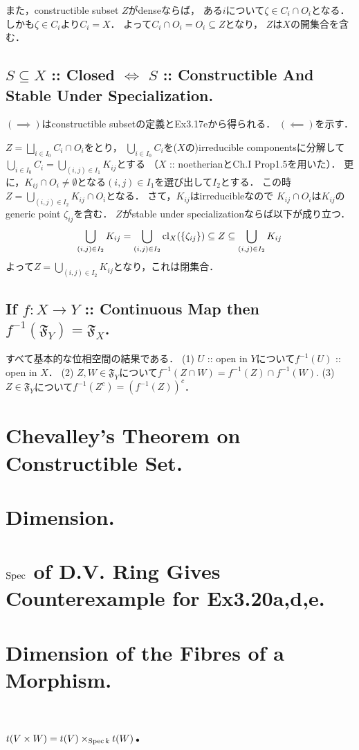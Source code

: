\documentclass[a4paper]{jsarticle}
\begin{document}
    また，constructible subset $Z$がdenseならば，
    ある$i$について$\zeta \in C_i \cap O_i$となる．
    しかも$\zeta \in C_i$より$C_i=X$．
    よって$C_i \cap O_i=O_i \subseteq Z$となり，
    $Z$は$X$の開集合を含む．

    \subsection{$S \subseteq X$ :: Closed $\iff$ $S$ :: Constructible And Stable Under Specialization.}
    $(\implies)$はconstructible subsetの定義とEx3.17eから得られる．
    $(\impliedby)$を示す．

    $Z=\bigsqcup_{i \in I_0} C_i \cap O_i$をとり，
    $\bigcup_{i \in I_0} C_i$を($X$の)irreducible componentsに分解して
    $\bigcup_{i \in I_0} C_i=\bigcup_{(i,j) \in I_1} K_{ij}$とする
    （$X$ :: noetherianとCh.I Prop1.5を用いた）．
    更に，$K_{ij} \cap O_i \neq \emptyset$となる$(i,j) \in I_1$を選び出して$I_2$とする．
    この時$Z=\bigcup_{(i,j) \in I_2} K_{ij} \cap O_i$となる．
    さて，$K_{ij}$はirreducibleなので
    $K_{ij} \cap O_i$は$K_{ij}$のgeneric point $\zeta_{ij}$を含む．
    $Z$がstable under specializationならば以下が成り立つ．
    \[
        \bigcup_{(i,j) \in I_2} K_{ij}
        =\bigcup_{(i,j) \in I_2} \operatorname{cl}_X(\{\zeta_{ij}\})
        \subseteq Z
        \subseteq \bigcup_{(i,j) \in I_2} K_{ij}
    \]
    よって$Z=\bigcup_{(i,j) \in I_2} K_{ij}$となり，これは閉集合．

    \subsection{If $f: X \to Y$ :: Continuous Map then $f^{-1}(\mathfrak{F}_Y)=\mathfrak{F}_X$.}
    すべて基本的な位相空間の結果である．
    (1) $U$ :: open in $Y$について$f^{-1}(U)$ :: open in $X$．
    (2) $Z,W \in \mathfrak{F}_Y$について$f^{-1}(Z \cap W)=f^{-1}(Z) \cap f^{-1}(W)$.
    (3) $Z \in \mathfrak{F}_Y$について$f^{-1}(Z^c)=(f^{-1}(Z))^c$．

\section{Chevalley's Theorem on Constructible Set.} %

\section{Dimension.} %

\section{$\operatorname{Spec}$ of D.V. Ring Gives Counterexample for Ex3.20a,d,e.} %

\section{Dimension of the Fibres of a Morphism.} %

\section{$t(V \times W)=t(V) \times_{\operatorname{Spec} k} t(W)$.} %
\end{document}
